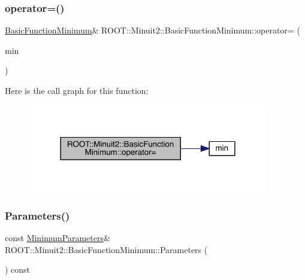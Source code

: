 \subsubsection{\texorpdfstring{operator=()}{operator=()}\hspace{0.1cm}{\footnotesize\ttfamily [3/3]}}
{\footnotesize\ttfamily \mbox{\hyperlink{classROOT_1_1Minuit2_1_1BasicFunctionMinimum}{Basic\+Function\+Minimum}}\& R\+O\+O\+T\+::\+Minuit2\+::\+Basic\+Function\+Minimum\+::operator= (\begin{DoxyParamCaption}\item[{const \mbox{\hyperlink{classROOT_1_1Minuit2_1_1BasicFunctionMinimum}{Basic\+Function\+Minimum}} \&}]{min }\end{DoxyParamCaption})\hspace{0.3cm}{\ttfamily [inline]}}

Here is the call graph for this function\+:
\nopagebreak
\begin{figure}[H]
\begin{center}
\leavevmode
\includegraphics[width=298pt]{de/d25/classROOT_1_1Minuit2_1_1BasicFunctionMinimum_ad143c1c314e041649151bac9bb9e7a91_cgraph}
\end{center}
\end{figure}
\mbox{\label{classROOT_1_1Minuit2_1_1BasicFunctionMinimum_acbbd51950f390d29541728f114b2d12e}} 
\subsubsection{\texorpdfstring{Parameters()}{Parameters()}\hspace{0.1cm}{\footnotesize\ttfamily [1/3]}}
{\footnotesize\ttfamily const \mbox{\hyperlink{classROOT_1_1Minuit2_1_1MinimumParameters}{Minimum\+Parameters}}\& R\+O\+O\+T\+::\+Minuit2\+::\+Basic\+Function\+Minimum\+::\+Parameters (\begin{DoxyParamCaption}{ }\end{DoxyParamCaption}) const\hspace{0.3cm}{\ttfamily [inline]}}

